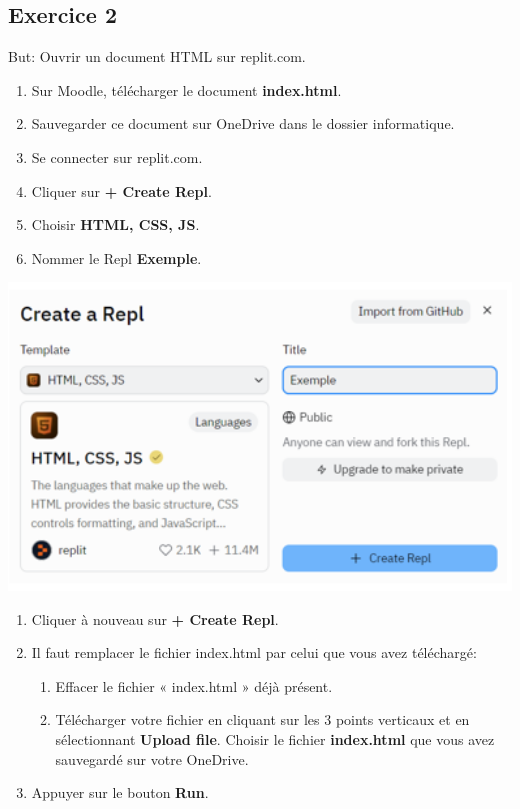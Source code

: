 \documentclass[a4paper,11pt]{article}
\begin{document}
\subsection{Exercice 2}
But: Ouvrir un document HTML sur replit.com.
\begin{multicols}{2}
\begin{enumerate}[label=\arabic*)]
\item Sur Moodle, télécharger le document \textbf{index.html}.
\item Sauvegarder ce document sur OneDrive dans le dossier informatique.
\item Se connecter sur replit.com.
\item Cliquer sur \textbf{+ Create Repl}.
\item Choisir \textbf{HTML, CSS, JS}.
\item Nommer le Repl \textbf{Exemple}.
\end{enumerate}
\includegraphics[width=1\textwidth]{images/replit.png} \\
\end{multicols}
\begin{enumerate}[label=\arabic*)]\addtocounter{enumi}{6}
\item Cliquer à nouveau sur \textbf{+ Create Repl}.
\item Il faut remplacer le fichier index.html par celui que vous avez téléchargé:
\begin{enumerate}
  \item Effacer le fichier « index.html » déjà présent.
  \item Télécharger votre fichier en cliquant sur les 3 points verticaux et en sélectionnant \textbf{Upload file}. Choisir le fichier \textbf{index.html} que vous avez sauvegardé sur votre OneDrive.
\end{enumerate}
\item Appuyer sur le bouton \textbf{Run}.
\end{enumerate}
\end{document}
